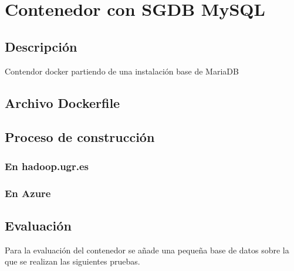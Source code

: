 \section{Contenedor con SGDB MySQL}

\subsection{Descripción}

Contendor docker partiendo de una instalación base de MariaDB

\subsection{Archivo Dockerfile}

\subsection{Proceso de construcción}

\subsubsection{En hadoop.ugr.es}

\subsubsection{En Azure}

\subsection{Evaluación}

Para la evaluación del contenedor se añade una pequeña base de datos sobre la que se realizan las siguientes pruebas.

